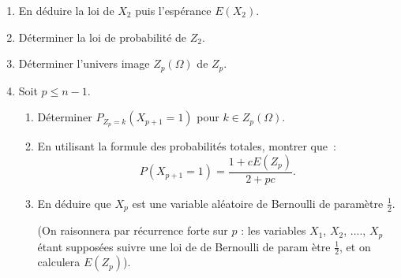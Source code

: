 \documentclass[a4paper, 11pt,reqno]{article}
\begin{document}
\begin{exercice}
\begin{enumerate}
\item  En d\'{e}duire la loi de $X_{2}$ puis l'esp\'{e}rance $E(X_{2})$.

\item D\'{e}terminer la loi de probabilit\'{e} de $Z_{2}$.

\item D\'{e}terminer l'univers image $Z_{p}\left( \Omega \right) $ de $Z_{p} 
$.

\item Soit $p\leqslant n-1$.

\begin{enumerate}
\item D\'{e}terminer $P_{Z_{p}=k}(X_{p+1}=1)$ pour $k\in Z_{p}\left( \Omega
\right) $.

\item En utilisant la formule des probabilit\'{e}s totales, montrer que~: 
\begin{equation*}
P(X_{p+1}=1)=\frac{1+cE(Z_{p})}{2+pc}.
\end{equation*}

\item En d\'{e}duire que $X_{p}$ est une variable al\'{e}atoire de Bernoulli
de param\`{e}tre $\displaystyle\frac{1}{2}$.

(On raisonnera par r\'{e}currence forte sur $p$ : les variables $X_{1}$, $X_{2}$,
...., $X_{p}$ \'{e}tant suppos\'{e}es suivre une loi de de Bernoulli de param%
\`{e}tre $\displaystyle\frac{1}{2}$, et on calculera $E(Z_{p})$).
\end{enumerate}
\end{enumerate}

\end{exercice}
\end{document}
